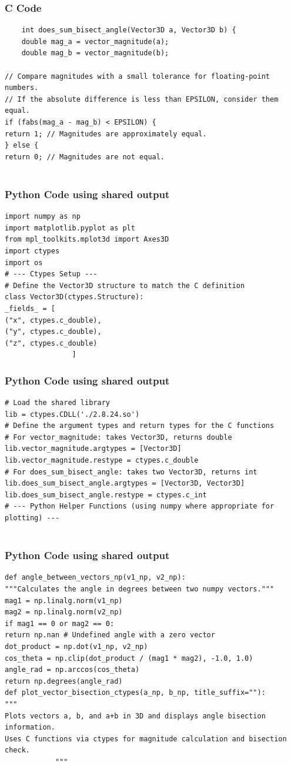 \documentclass{beamer}
\begin{document}
		\begin{frame}[fragile]
			\frametitle{C Code}
			
			\begin{lstlisting}
	int does_sum_bisect_angle(Vector3D a, Vector3D b) {
	double mag_a = vector_magnitude(a);
	double mag_b = vector_magnitude(b);
				
// Compare magnitudes with a small tolerance for floating-point numbers.
// If the absolute difference is less than EPSILON, consider them equal.
if (fabs(mag_a - mag_b) < EPSILON) {
return 1; // Magnitudes are approximately equal.
} else {
return 0; // Magnitudes are not equal.
				
			\end{lstlisting}
		\end{frame}
		
		\begin{frame}[fragile]
			\frametitle{Python Code using shared output}
			\begin{lstlisting}
import numpy as np
import matplotlib.pyplot as plt
from mpl_toolkits.mplot3d import Axes3D
import ctypes
import os
# --- Ctypes Setup ---
# Define the Vector3D structure to match the C definition
class Vector3D(ctypes.Structure):
_fields_ = [
("x", ctypes.c_double),
("y", ctypes.c_double),
("z", ctypes.c_double)
				]
			\end{lstlisting}
		\end{frame}
		\begin{frame}[fragile]
			\frametitle{Python Code using shared output}
			\begin{lstlisting}		
# Load the shared library
lib = ctypes.CDLL('./2.8.24.so')
# Define the argument types and return types for the C functions
# For vector_magnitude: takes Vector3D, returns double
lib.vector_magnitude.argtypes = [Vector3D]
lib.vector_magnitude.restype = ctypes.c_double
# For does_sum_bisect_angle: takes two Vector3D, returns int
lib.does_sum_bisect_angle.argtypes = [Vector3D, Vector3D]
lib.does_sum_bisect_angle.restype = ctypes.c_int
# --- Python Helper Functions (using numpy where appropriate for plotting) ---
				
			\end{lstlisting}
		\end{frame}
		\begin{frame}[fragile]
			\frametitle{Python Code using shared output}
			\begin{lstlisting}
def angle_between_vectors_np(v1_np, v2_np):
"""Calculates the angle in degrees between two numpy vectors."""
mag1 = np.linalg.norm(v1_np)
mag2 = np.linalg.norm(v2_np)
if mag1 == 0 or mag2 == 0:
return np.nan # Undefined angle with a zero vector
dot_product = np.dot(v1_np, v2_np)
cos_theta = np.clip(dot_product / (mag1 * mag2), -1.0, 1.0)
angle_rad = np.arccos(cos_theta)
return np.degrees(angle_rad)
def plot_vector_bisection_ctypes(a_np, b_np, title_suffix=""):
"""
Plots vectors a, b, and a+b in 3D and displays angle bisection information.
Uses C functions via ctypes for magnitude calculation and bisection check.
			"""
			\end{lstlisting}
		\end{frame}
\end{document}
